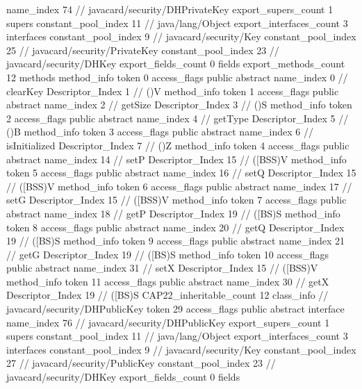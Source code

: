 {{{			name_index	74		// javacard/security/DHPrivateKey
			export_supers_count	1
			supers {
				constant_pool_index	11		// java/lang/Object
			}
			export_interfaces_count	3
			interfaces {
				constant_pool_index	9		// javacard/security/Key
				constant_pool_index	25		// javacard/security/PrivateKey
				constant_pool_index	23		// javacard/security/DHKey
			}
			export_fields_count	0
			fields {
			}
			export_methods_count	12
			methods {
				method_info {
					token	0
					access_flags	public abstract
					name_index	0		// clearKey
					Descriptor_Index	1		// ()V
				}
				method_info {
					token	1
					access_flags	public abstract
					name_index	2		// getSize
					Descriptor_Index	3		// ()S
				}
				method_info {
					token	2
					access_flags	public abstract
					name_index	4		// getType
					Descriptor_Index	5		// ()B
				}
				method_info {
					token	3
					access_flags	public abstract
					name_index	6		// isInitialized
					Descriptor_Index	7		// ()Z
				}
				method_info {
					token	4
					access_flags	public abstract
					name_index	14		// setP
					Descriptor_Index	15		// ([BSS)V
				}
				method_info {
					token	5
					access_flags	public abstract
					name_index	16		// setQ
					Descriptor_Index	15		// ([BSS)V
				}
				method_info {
					token	6
					access_flags	public abstract
					name_index	17		// setG
					Descriptor_Index	15		// ([BSS)V
				}
				method_info {
					token	7
					access_flags	public abstract
					name_index	18		// getP
					Descriptor_Index	19		// ([BS)S
				}
				method_info {
					token	8
					access_flags	public abstract
					name_index	20		// getQ
					Descriptor_Index	19		// ([BS)S
				}
				method_info {
					token	9
					access_flags	public abstract
					name_index	21		// getG
					Descriptor_Index	19		// ([BS)S
				}
				method_info {
					token	10
					access_flags	public abstract
					name_index	31		// setX
					Descriptor_Index	15		// ([BSS)V
				}
				method_info {
					token	11
					access_flags	public abstract
					name_index	30		// getX
					Descriptor_Index	19		// ([BS)S
				}
			}
			CAP22_inheritable_count	12
		}
		class_info {		// javacard/security/DHPublicKey
			token	29
			access_flags	public abstract interface
			name_index	76		// javacard/security/DHPublicKey
			export_supers_count	1
			supers {
				constant_pool_index	11		// java/lang/Object
			}
			export_interfaces_count	3
			interfaces {
				constant_pool_index	9		// javacard/security/Key
				constant_pool_index	27		// javacard/security/PublicKey
				constant_pool_index	23		// javacard/security/DHKey
			}
			export_fields_count	0
			fields {
}}}}
